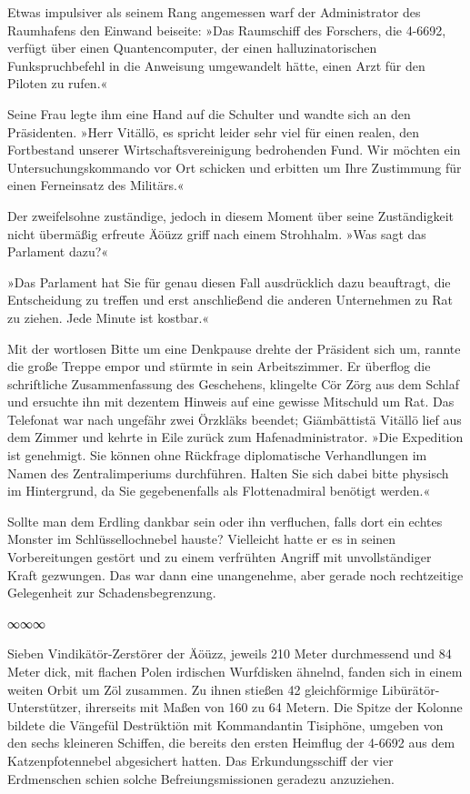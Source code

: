 Etwas impulsiver als seinem Rang angemessen warf der Administrator des Raumhafens den Einwand beiseite: »Das Raumschiff des Forschers, die 4-6692, verfügt über einen Quantencomputer, der einen halluzinatorischen Funkspruchbefehl in die Anweisung umgewandelt hätte, einen Arzt für den Piloten zu rufen.«

Seine Frau legte ihm eine Hand auf die Schulter und wandte sich an den Präsidenten. »Herr Vitällö, es spricht leider sehr viel für einen realen, den Fortbestand unserer Wirtschaftsvereinigung bedrohenden Fund. Wir möchten ein Untersuchungskommando vor Ort schicken und erbitten um Ihre Zustimmung für einen Ferneinsatz des Militärs.«

Der zweifelsohne zuständige, jedoch in diesem Moment über seine Zuständigkeit nicht übermäßig erfreute Äöüzz griff nach einem Strohhalm. »Was sagt das Parlament dazu?«

»Das Parlament hat Sie für genau diesen Fall ausdrücklich dazu beauftragt, die Entscheidung zu treffen und erst anschließend die anderen Unternehmen zu Rat zu ziehen. Jede Minute ist kostbar.«

Mit der wortlosen Bitte um eine Denkpause drehte der Präsident sich um, rannte die große Treppe empor und stürmte in sein Arbeitszimmer. Er überflog die schriftliche Zusammenfassung des Geschehens, klingelte Cör Zörg aus dem Schlaf und ersuchte ihn mit dezentem Hinweis auf eine gewisse Mitschuld um Rat. Das Telefonat war nach ungefähr zwei Örzkläks beendet; Giämbättistä Vitällö lief aus dem Zimmer und kehrte in Eile zurück zum Hafenadministrator. »Die Expedition ist genehmigt. Sie können ohne Rückfrage diplomatische Verhandlungen im Namen des Zentralimperiums durchführen. Halten Sie sich dabei bitte physisch im Hintergrund, da Sie gegebenenfalls als Flottenadmiral benötigt werden.«

Sollte man dem Erdling dankbar sein oder ihn verfluchen, falls dort ein echtes Monster im Schlüssellochnebel hauste? Vielleicht hatte er es in seinen Vorbereitungen gestört und zu einem verfrühten Angriff mit unvollständiger Kraft gezwungen. Das war dann eine unangenehme, aber gerade noch rechtzeitige Gelegenheit zur Schadensbegrenzung.

\begin{center}
∞∞∞
\end{center}

Sieben Vindikätör-Zerstörer der Äöüzz, jeweils 210 Meter durchmessend und 84 Meter dick, mit flachen Polen irdischen Wurfdisken ähnelnd, fanden sich in einem weiten Orbit um Zöl zusammen. Zu ihnen stießen 42 gleichförmige Libürätör-Unterstützer, ihrerseits mit Maßen von 160 zu 64 Metern. Die Spitze der Kolonne bildete die Vängefül Destrüktiön mit Kommandantin Tisiphöne, umgeben von den sechs kleineren Schiffen, die bereits den ersten Heimflug der 4-6692 aus dem Katzenpfotennebel abgesichert hatten. Das Erkundungsschiff der vier Erdmenschen schien solche Befreiungsmissionen geradezu anzuziehen.

